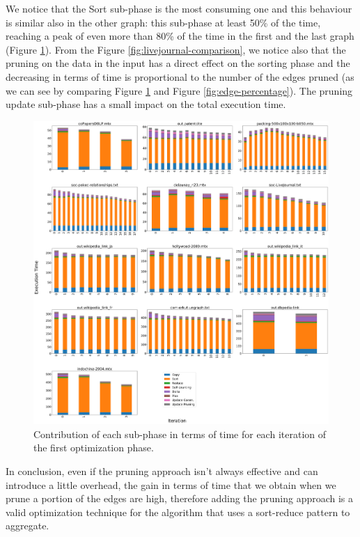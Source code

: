 We notice that the Sort sub-phase is the most consuming one and this behaviour is similar also in the other graph: this sub-phase at least 50\% of the time, reaching a peak of even more than 80\% of the time in the first and the last graph (Figure \ref{fig:suphases-sort}). From the Figure \ref{fig:livejournal-comparison}, we notice also that the pruning on the data in the input has a direct effect on the sorting phase and the decreasing in terms of time is proportional to the number of the edges pruned (as we can see by comparing Figure \ref{fig:suphases-sort} and Figure \ref{fig:edge-percentage}). The pruning update sub-phase has a small impact on the total execution time. 
\begin{figure}[t!]
	\centering
	\includegraphics[width=1\linewidth]{0-resources/suphases-sort}
	\caption{Contribution of each sub-phase in terms of time for each iteration of the first optimization phase. }
	\label{fig:suphases-sort}
\end{figure}
In conclusion, even if the pruning approach isn't always effective and can introduce a little overhead, the gain in terms of time that we obtain when we prune a portion of the edges are high, therefore adding the pruning approach is a valid optimization technique for the algorithm that uses a sort-reduce pattern to aggregate. 
